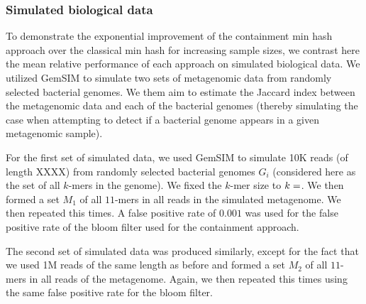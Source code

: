 \documentclass[11pt,reqno]{amsart}
\theoremstyle{remark}
\numberwithin{equation}{section}
\newcommand{\SimulatedBiologicalDataNumReplicates}{\protect }
\newcommand{\SimulatedBiologicalDataSmallKsize}{\protect }
\newcommand{\SimulatedBiologicalDataSmallNumGenomes}{\protect }
\newcommand{\SimulatedBiologicalDataSmallNumReplicates}{\protect }
\newcommand{\SimulatedBiologicalDataSmallRelSize}{\protect }
\begin{document}
\subsubsection{Simulated biological data}
To demonstrate the exponential improvement of the containment min hash approach over the classical min hash for increasing sample sizes, we contrast here the mean relative performance of each approach on simulated biological data. We utilized GemSIM \cite{mcelroy2012gemsim} to simulate two sets of metagenomic data from randomly selected bacterial genomes. We them aim to estimate the Jaccard index between the metagenomic data and each of the bacterial genomes (thereby simulating the case when attempting to detect if a bacterial genome appears in a given metagenomic sample).

For the first set of simulated data, we used GemSIM to simulate 10K reads (of length XXXX) from \SimulatedBiologicalDataSmallNumGenomes randomly selected bacterial genomes $G_i$ (considered here as the set of all $k$-mers in the genome). We fixed the $k$-mer size to $k=\SimulatedBiologicalDataSmallKsize$. We then formed a set $M_1$ of all $11$-mers in all reads in the simulated metagenome. We then repeated this \SimulatedBiologicalDataSmallNumReplicates times. A false positive rate of $0.001$ was used for the false positive rate of the bloom filter used for the containment approach.

The second set of simulated data was produced similarly, except for the fact that we used 1M reads of the same length as before and formed a set $M_2$ of all $11$-mers in all reads of the metagenome. Again, we then repeated this \SimulatedBiologicalDataNumReplicates times using the same false positive rate for the bloom filter.

 
 
\end{document}
